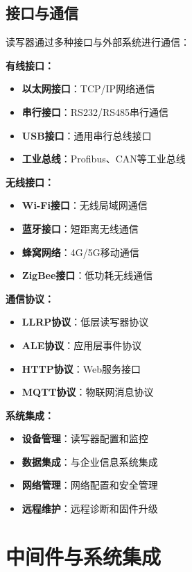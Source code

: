 \documentclass[12pt,UTF8]{ctexbook}
\begin{document}
\begin{itemize}[leftmargin=3.5em]
\begin{itemize}[leftmargin=3.5em]
\section{接口与通信}

读写器通过多种接口与外部系统进行通信：

\textbf{有线接口：}
\begin{itemize}[leftmargin=3.5em]
    \item \textbf{以太网接口}：TCP/IP网络通信
    \item \textbf{串行接口}：RS232/RS485串行通信
    \item \textbf{USB接口}：通用串行总线接口
    \item \textbf{工业总线}：Profibus、CAN等工业总线
\end{itemize}

\textbf{无线接口：}
\begin{itemize}[leftmargin=3.5em]
    \item \textbf{Wi-Fi接口}：无线局域网通信
    \item \textbf{蓝牙接口}：短距离无线通信
    \item \textbf{蜂窝网络}：4G/5G移动通信
    \item \textbf{ZigBee接口}：低功耗无线通信
\end{itemize}

\textbf{通信协议：}
\begin{itemize}[leftmargin=3.5em]
    \item \textbf{LLRP协议}：低层读写器协议
    \item \textbf{ALE协议}：应用层事件协议
    \item \textbf{HTTP协议}：Web服务接口
    \item \textbf{MQTT协议}：物联网消息协议
\end{itemize}

\textbf{系统集成：}
\begin{itemize}[leftmargin=3.5em]
    \item \textbf{设备管理}：读写器配置和监控
    \item \textbf{数据集成}：与企业信息系统集成
    \item \textbf{网络管理}：网络配置和安全管理
    \item \textbf{远程维护}：远程诊断和固件升级
\end{itemize}

\chapter{中间件与系统集成}


\end{itemize}
\end{itemize}
\end{document}
